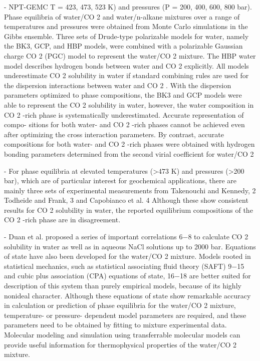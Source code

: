 \cite{Jiang2017a}- NPT-GEMC T = 423, 473, 523 K) and pressures  (P = 200, 400, 600, 800 bar). Phase equilibria of water/CO 2 and water/n-alkane
mixtures over a range of temperatures and pressures were
obtained from Monte Carlo simulations in the Gibbs ensemble.
Three sets of Drude-type polarizable models for water, namely the
BK3, GCP, and HBP models, were combined with a polarizable
Gaussian charge CO 2 (PGC) model to represent the water/CO 2
mixture. The HBP water model describes hydrogen bonds
between water and CO 2 explicitly. All models underestimate
CO 2 solubility in water if standard combining rules are used for
the dispersion interactions between water and CO 2 . With the
dispersion parameters optimized to phase compositions, the BK3
and GCP models were able to represent the CO 2 solubility in
water, however, the water composition in CO 2 -rich phase is
systematically underestimated. Accurate representation of compo-
sitions for both water- and CO 2 -rich phases cannot be achieved even after optimizing the cross interaction parameters. By
contrast, accurate compositions for both water- and CO 2 -rich phases were obtained with hydrogen bonding parameters
determined from the second virial coeﬃcient for water/CO 2

- For phase equilibria at elevated temperatures (>473 K) and pressures (>200 bar), which are of particular interest for geochemical applications,
there are mainly three sets of experimental measurements from
Takenouchi and Kennedy, 2 Todheide and Frank, 3 and
Capobianco et al. 4 Although these show consistent results for
CO 2 solubility in water, the reported equilibrium compositions
of the CO 2 -rich phase are in disagreement.

- Duan et al. proposed a series of important
correlations 6−8 to calculate CO 2 solubility in water as well as
in aqueous NaCl solutions up to 2000 bar. Equations of state
have also been developed for the water/CO 2 mixture. Models
rooted in statistical mechanics, such as statistical associating
ﬂuid theory (SAFT) 9−15 and cubic plus association (CPA)
equations of state, 16−18 are better suited for description of this
system than purely empirical models, because of its highly
nonideal character. Although these equations of state show
remarkable accuracy in calculation or prediction of phase
equilibria for the water/CO 2 mixture, temperature- or pressure-
dependent model parameters are required, and these
parameters need to be obtained by ﬁtting to mixture
experimental data. Molecular modeling and simulation using transferrable
molecular models can provide useful information for thermophysical properties of the water/CO 2 mixture.

